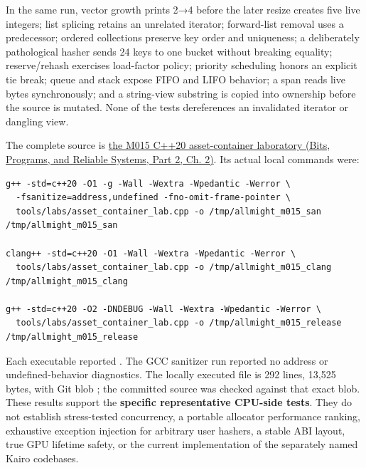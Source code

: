 In the same run, vector growth prints 2→4 before the later resize creates five live integers; list splicing retains an unrelated iterator; forward-list removal uses a predecessor; ordered collections preserve key order and uniqueness; a deliberately pathological hasher sends 24 keys to one bucket without breaking equality; reserve/rehash exercises load-factor policy; priority scheduling honors an explicit tie break; queue and stack expose FIFO and LIFO behavior; a span reads live bytes synchronously; and a string-view substring is copied into ownership before the source is mutated. None of the tests dereferences an invalidated iterator or dangling view.

The complete source is \href{../01-Bits-Programs-and-Reliable-Systems-P02/main.pdf\#source-file-e829cf731b17419e282775cf}{the M015 C++20 asset-container laboratory (Bits, Programs, and Reliable Systems, Part 2, Ch. 2)}. Its actual local commands were:

\begin{verbatim}
g++ -std=c++20 -O1 -g -Wall -Wextra -Wpedantic -Werror \
  -fsanitize=address,undefined -fno-omit-frame-pointer \
  tools/labs/asset_container_lab.cpp -o /tmp/allmight_m015_san
/tmp/allmight_m015_san

clang++ -std=c++20 -O1 -Wall -Wextra -Wpedantic -Werror \
  tools/labs/asset_container_lab.cpp -o /tmp/allmight_m015_clang
/tmp/allmight_m015_clang

g++ -std=c++20 -O2 -DNDEBUG -Wall -Wextra -Wpedantic -Werror \
  tools/labs/asset_container_lab.cpp -o /tmp/allmight_m015_release
/tmp/allmight_m015_release
\end{verbatim}

Each executable reported . The GCC sanitizer run reported no address or undefined-behavior diagnostics. The locally executed file is 292 lines, 13,525 bytes, with Git blob ; the committed source was checked against that exact blob. These results support the \textbf{specific representative CPU-side tests}. They do not establish stress-tested concurrency, a portable allocator performance ranking, exhaustive exception injection for arbitrary user hashers, a stable ABI layout, true GPU lifetime safety, or the current implementation of the separately named Kairo codebases.

